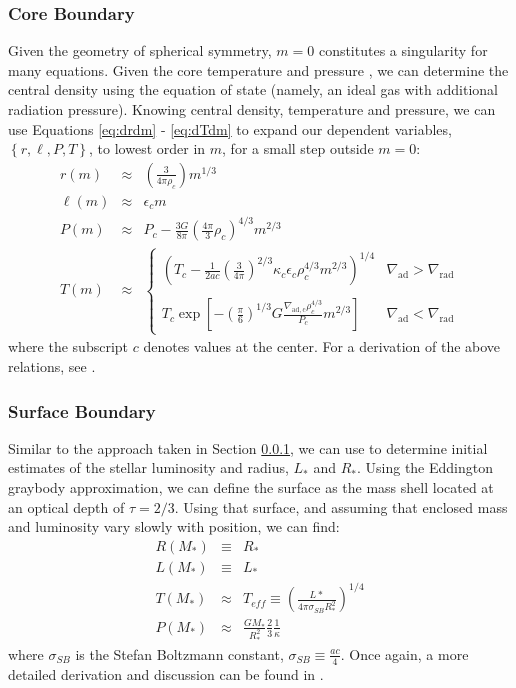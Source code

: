 \subsubsection{Core Boundary}
\label{sec:numerical:boundary:core}
Given the geometry of spherical symmetry, $m=0$ constitutes a singularity for many equations.  Given the core temperature and pressure \citep[initial estimates taken from][]{Hansen}, we can determine the central density using the equation of state (namely, an ideal gas with additional radiation pressure).  Knowing central density, temperature and pressure, we can use Equations \ref{eq:drdm} - \ref{eq:dTdm} to expand our dependent variables, $\left\{ r, \ell, P, T \right\}$, to lowest order in $m$, for a small step outside $m=0$:
\begin{eqnarray}
  r(m) &\approx& \left( \frac{3}{4 \pi \rho_c} \right) m^{1/3} \\
  \ell(m) &\approx& \epsilon_c m \\
  P(m) &\approx& P_c - \frac{3 G}{8 \pi} \left(\frac{4 \pi}{3} \rho_c \right)^{4/3} m^{2/3} \\
    T(m) &\approx& \begin{cases}
      \left(T_c  - \frac{1}{2 a c} \left( \frac{3}{4 \pi}\right)^{2/3} \kappa_c \epsilon_c \rho_c^{4/3} m^{2/3} \right)^{1/4} & \nabla_\mathrm{ad} > \nabla_\mathrm{rad}\\
      &  \\
      T_c \exp \left[- \left(\frac{\pi}{6}\right)^{1/3} G 
      \frac{\nabla_\mathrm{ad, c} \rho_c^{4/3}}{P_c} m^{2/3} \right]& \nabla_\mathrm{ad} < \nabla_\mathrm{rad}
  \end{cases}
\end{eqnarray}
where the subscript $c$ denotes values at the center.  For a derivation of the above relations, see \citet[Chapter 11]{KippenhahnWeigertWeiss}.

\subsubsection{Surface Boundary}
\label{sec:numerical:boundary:surface}
Similar to the approach taken in Section \ref{sec:numerical:boundary:core}, we can use \cite{Hansen} to determine initial estimates of the stellar luminosity and radius, $L_\ast$ and $R_\ast$.  Using the Eddington graybody approximation, we can define the surface as the mass shell located at an optical depth of $\tau=2/3$.  Using that surface, and assuming that enclosed mass and luminosity vary slowly with position, we can find: 
\begin{eqnarray}
  R(M_\ast) &\equiv& R_\ast \label{eq:surface:R} \\
  L(M_\ast) &\equiv& L_\ast \label{eq:surface:L} \\
  T(M_\ast) &\approx& T_{eff} \equiv \left( \frac{L\ast}{4 \pi \sigma_{SB} R_\ast^2} \right)^{1/4} \label{eq:surface:T} \\
  P(M_\ast) &\approx& \frac{G M_\ast}{R_\ast^2}\frac{2}{3} \frac{1}{\kappa} \label{eq:surface:P}
\end{eqnarray}
where $\sigma_{SB}$ is the Stefan Boltzmann constant, $\sigma_{SB} \equiv \frac{a c}{4}$.  Once again, a more detailed derivation and discussion can be found in \cite{KippenhahnWeigertWeiss}.

